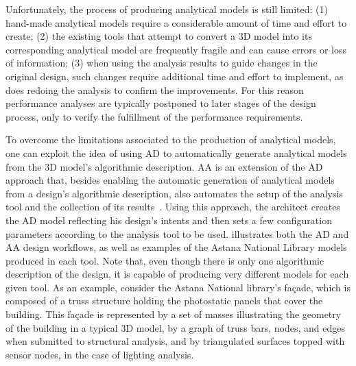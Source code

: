 Unfortunately, the process of producing analytical models is still limited: (1) hand-made analytical models require a considerable amount of time and effort to create; (2) the existing tools that attempt to convert a 3D model into its corresponding analytical model are frequently fragile and can cause errors or loss of information; (3) when using the analysis results to guide changes in the original design, such changes require additional time and effort to implement, as does redoing the analysis to confirm the improvements. For this reason performance analyses are typically postponed to later stages of the design process, only to verify the fulfillment of the performance requirements.

To overcome the limitations associated to the production of analytical models, one can exploit the idea of using \ac{AD} to automatically generate analytical models from the 3D model's algorithmic description. \ac{AA} is an extension of the \ac{AD} approach that, besides enabling the automatic generation of analytical models from a design's algorithmic description, also automates the setup of the analysis tool and the collection of its results~\cite{Aguiar2017}. Using this approach, the architect creates the \ac{AD} model reflecting his design's intents and then sets a few configuration parameters according to the analysis tool to be used.  illustrates both the \ac{AD} and \ac{AA} design workflows, as well as examples of the Astana National Library models produced in each tool. Note that, even though there is only one algorithmic description of the design, it is capable of producing very different models for each given tool. As an example, consider the Astana National library's façade, which is composed of a truss structure holding the photostatic panels that cover the building. This façade is represented by a set of masses illustrating the geometry of the building in a typical 3D model, by a graph of truss bars, nodes, and edges when submitted to structural analysis, and by triangulated surfaces topped with sensor nodes, in the case of lighting analysis.


